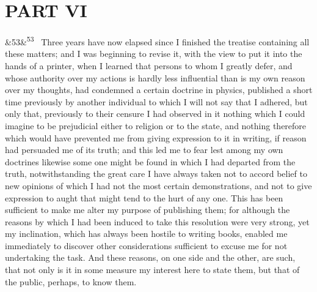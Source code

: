 \documentclass[12pt]{article}
\newcommand{\para}[1][]{\par\noindent\ifx&#1&\else\textsuperscript{\footnotesize #1}~\fi}
\begin{document}
\section*{PART VI}

\para[53] Three years have now elapsed since I finished the treatise containing all these matters; and I was beginning to revise it, with the view to put it into the hands of a printer, when I learned that persons to whom I greatly defer, and whose authority over my actions is hardly less influential than is my own reason over my thoughts, had condemned a certain doctrine in physics, published a short time previously by another individual to which I will not say that I adhered, but only that, previously to their censure I had observed in it nothing which I could imagine to be prejudicial either to religion or to the state, and nothing therefore which would have prevented me from giving expression to it in writing, if reason had persuaded me of its truth; and this led me to fear lest among my own doctrines likewise some one might be found in which I had departed from the truth, notwithstanding the great care I have always taken not to accord belief to new opinions of which I had not the most certain demonstrations, and not to give expression to aught that might tend to the hurt of any one. This has been sufficient to make me alter my purpose of publishing them; for although the reasons by which I had been induced to take this resolution were very strong, yet my inclination, which has always been hostile to writing books, enabled me immediately to discover other considerations sufficient to excuse me for not undertaking the task. And these reasons, on one side and the other, are such, that not only is it in some measure my interest here to state them, but that of the public, perhaps, to know them.
\end{document}
